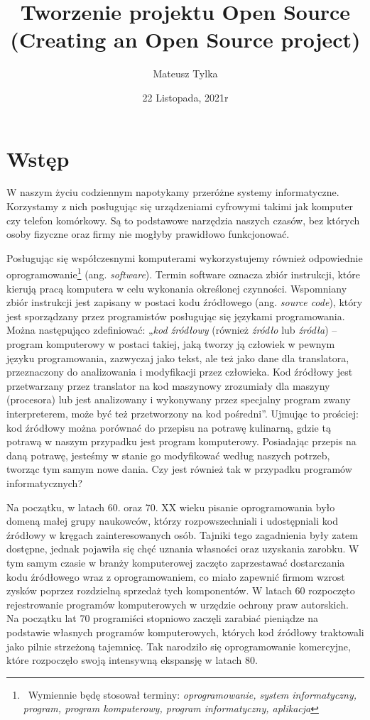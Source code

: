 \documentclass{article}
\title{Tworzenie projektu Open Source (Creating an Open Source project)}
\author{Mateusz Tylka}
\date{22 Listopada, 2021r}
\begin{document}
\maketitle
\newpage
\newpage
\tableofcontents
\newpage

\section{Wstęp}

\hspace{4mm} W naszym życiu codziennym napotykamy przeróżne systemy informatyczne. Korzystamy z nich posługując się urządzeniami cyfrowymi takimi jak komputer czy telefon komórkowy. Są to podstawowe narzędzia naszych czasów, bez których osoby fizyczne oraz firmy nie mogłyby prawidłowo funkcjonować.

Posługując się współczesnymi komputerami wykorzystujemy również odpowiednie oprogramowanie\footnote{\, Wymiennie będę stosował terminy: \emph{oprogramowanie, system informatyczny, program, program komputerowy, program informatyczny, aplikacja}} (ang. \emph{software}). Termin software oznacza zbiór instrukcji, które kierują pracą komputera w celu wykonania określonej czynności\cite{Kotula}. Wspomniany zbiór instrukcji jest zapisany w postaci kodu źródłowego (ang. \emph{source code}), który jest sporządzany przez programistów posługując się językami programowania. Można następująco zdefiniować: „\emph{kod źródłowy} (również \emph{źródło} lub \emph{źródła}) – program komputerowy w postaci takiej, jaką tworzy ją człowiek w pewnym języku programowania, zazwyczaj jako tekst, ale też jako dane dla translatora, przeznaczony do analizowania i modyfikacji przez człowieka. Kod źródłowy jest przetwarzany przez translator na kod maszynowy zrozumiały dla maszyny (procesora) lub jest analizowany i  wykonywany przez specjalny program zwany interpreterem, może być też przetworzony na kod pośredni”\cite{Kotula}. Ujmując to prościej: kod źródłowy można porównać do przepisu na potrawę kulinarną, gdzie tą potrawą w naszym przypadku jest program komputerowy. Posiadając przepis na daną potrawę, jesteśmy w stanie go modyfikować według naszych potrzeb, tworząc tym samym nowe dania. Czy jest również tak w przypadku programów informatycznych? 

Na początku, w latach 60. oraz 70. XX wieku pisanie oprogramowania było domeną małej grupy naukowców, którzy rozpowszechniali i udostępniali kod źródłowy w kręgach zainteresowanych osób. Tajniki tego zagadnienia były zatem dostępne, jednak pojawiła się chęć uznania własności oraz uzyskania zarobku. W tym samym czasie w branży komputerowej zaczęto zaprzestawać dostarczania kodu źródłowego wraz z oprogramowaniem, co miało zapewnić firmom wzrost zysków poprzez rozdzielną sprzedaż tych komponentów. W latach 60 rozpoczęto rejestrowanie programów komputerowych w urzędzie ochrony praw autorskich\cite{Kotula}. Na początku lat 70 programiści stopniowo zaczęli zarabiać pieniądze na podstawie własnych programów komputerowych, których kod źródłowy traktowali jako pilnie strzeżoną tajemnicę\cite{Richter}. Tak narodziło się oprogramowanie komercyjne, które rozpoczęło swoją intensywną ekspansję w latach 80\cite{Kotula}.
\end{document}
